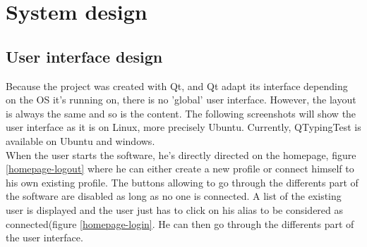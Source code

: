 \part{System design}

\chapter{User interface design}
Because the project was created with Qt, and Qt adapt its interface depending on the OS it's running on, there is no 'global' user interface. However, the layout is always the same and so is the content. The following screenshots will show the user interface as it is on Linux, more precisely Ubuntu. Currently, QTypingTest is available on Ubuntu and windows.\\
When the user starts the software, he's directly directed on the homepage, figure \ref{homepage-logout} where he can either create a new profile or connect himself to his own existing profile. The buttons allowing to go through the differents part of the software are disabled as long as no one is connected. A list of the existing user is displayed and the user just has to click on his alias to be considered as connected(figure \ref{homepage-login}. He can then go through the differents part of the user interface. 
